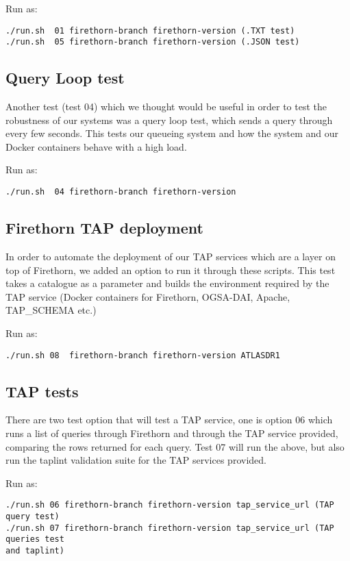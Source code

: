 \documentclass[review,5p,authoryear,12pt]{elsarticle}
\begin{document}
Run as:
\begin{verbatim}
./run.sh  01 firethorn-branch firethorn-version (.TXT test)
./run.sh  05 firethorn-branch firethorn-version (.JSON test)
\end{verbatim}

\subsection{Query Loop test}
Another test (test 04) which we thought would be useful in order to test the robustness of our systems was a query loop test, which sends a query through every few seconds. This tests our queueing system and how the system and our Docker containers behave with a high load.

Run as: 
\begin{verbatim}
./run.sh  04 firethorn-branch firethorn-version
\end{verbatim}

\subsection{Firethorn TAP deployment}

In order to automate the deployment of our TAP services which are a layer on top of Firethorn, we added an option to run it through these scripts. 
This test takes a catalogue as a parameter and builds the environment required
by the TAP service (Docker containers for Firethorn, OGSA-DAI, Apache, TAP\_SCHEMA etc.)

Run as: 
\begin{verbatim}
./run.sh 08  firethorn-branch firethorn-version ATLASDR1
\end{verbatim}


\subsection{TAP tests}
There are two test option that will test a TAP service, one is option 06 which runs a list of queries through Firethorn and through the TAP service provided, comparing the rows returned for each query. Test 07 will run the above, but also run the taplint validation suite for the TAP services provided.

Run as: 
\begin{verbatim}
./run.sh 06 firethorn-branch firethorn-version tap_service_url (TAP query test)
./run.sh 07 firethorn-branch firethorn-version tap_service_url (TAP queries test
and taplint)
\end{verbatim}
\end{document}
